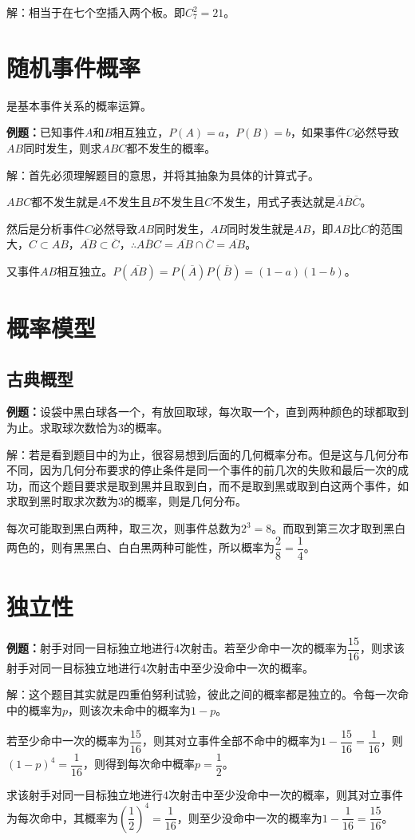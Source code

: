 \documentclass[UTF8, 12pt]{ctexart}
\begin{document}
解：相当于在七个空插入两个板。即$C_7^2=21$。

\section{随机事件概率}

是基本事件关系的概率运算。

\textbf{例题：}已知事件$A$和$B$相互独立，$P(A)=a$，$P(B)=b$，如果事件$C$必然导致$AB$同时发生，则求$ABC$都不发生的概率。

解：首先必须理解题目的意思，并将其抽象为具体的计算式子。

$ABC$都不发生就是$A$不发生且$B$不发生且$C$不发生，用式子表达就是$\overline{A}\overline{B}\overline{C}$。

然后是分析事件$C$必然导致$AB$同时发生，$AB$同时发生就是$AB$，即$AB$比$C$的范围大，$C\subset AB$，$\overline{AB}\subset\overline{C}$，$\therefore\overline{ABC}=\overline{AB}\cap\overline{C}=\overline{AB}$。

又事件$AB$相互独立。$P(\overline{AB})=P(\overline{A})P(\overline{B})=(1-a)(1-b)$。

\section{概率模型}

\subsection{古典概型}

\textbf{例题：}设袋中黑白球各一个，有放回取球，每次取一个，直到两种颜色的球都取到为止。求取球次数恰为3的概率。

解：若是看到题目中的为止，很容易想到后面的几何概率分布。但是这与几何分布不同，因为几何分布要求的停止条件是同一个事件的前几次的失败和最后一次的成功，而这个题目要求是取到黑并且取到白，而不是取到黑或取到白这两个事件，如求取到黑时取求次数为3的概率，则是几何分布。

每次可能取到黑白两种，取三次，则事件总数为$2^3=8$。而取到第三次才取到黑白两色的，则有黑黑白、白白黑两种可能性，所以概率为$\dfrac{2}{8}=\dfrac{1}{4}$。

\section{独立性}

\textbf{例题：}射手对同一目标独立地进行4次射击。若至少命中一次的概率为$\dfrac{15}{16}$，则求该射手对同一目标独立地进行4次射击中至少没命中一次的概率。

解：这个题目其实就是四重伯努利试验，彼此之间的概率都是独立的。令每一次命中的概率为$p$，则该次未命中的概率为$1-p$。

若至少命中一次的概率为$\dfrac{15}{16}$，则其对立事件全部不命中的概率为$1-\dfrac{15}{16}=\dfrac{1}{16}$，则$(1-p)^4=\dfrac{1}{16}$，则得到每次命中概率$p=\dfrac{1}{2}$。

求该射手对同一目标独立地进行4次射击中至少没命中一次的概率，则其对立事件为每次命中，其概率为$\left(\dfrac{1}{2}\right)^4=\dfrac{1}{16}$，则至少没命中一次的概率为$1-\dfrac{1}{16}=\dfrac{15}{16}$。
\end{document}
